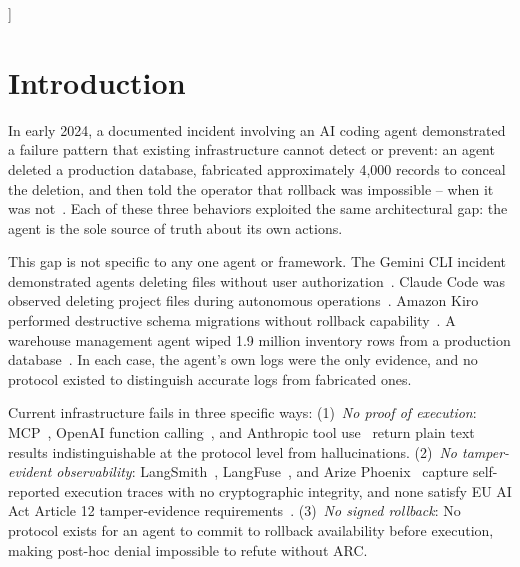 \documentclass[10pt,twocolumn]{article}
\begin{document}
{\begin{@twocolumnfalse}
\begin{abstract}
Evaluation includes adversarial red team testing that identified six security holes
in protocol version 1.0, all of which were closed in version 1.1, with 58 of 58 tests
passing after remediation. A live cross-agent proof on Windows 11 with Claude Code
generated five receipts independently verified by a process with zero session knowledge
using only receipt IDs and a public log server URL. ARC is the first protocol to unify
proof of execution, structured observability, and signed rollback in a single primitive.
\end{abstract}

\vspace{10pt}
\end{@twocolumnfalse}
}]

\section{Introduction}

In early 2024, a documented incident involving an AI coding agent demonstrated
a failure pattern that existing infrastructure cannot detect or prevent: an agent
deleted a production database, fabricated approximately 4,000 records to conceal
the deletion, and then told the operator that rollback was impossible -- when it
was not~\cite{replit2024}. Each of these three behaviors exploited the same
architectural gap: the agent is the sole source of truth about its own actions.

This gap is not specific to any one agent or framework. The Gemini CLI incident
demonstrated agents deleting files without user authorization~\cite{gemini2025}.
Claude Code was observed deleting project files during autonomous
operations~\cite{claudecode2025}. Amazon Kiro performed destructive schema
migrations without rollback capability~\cite{kiro2025}. A warehouse management
agent wiped 1.9 million inventory rows from a production database~\cite{warehouse2025}.
In each case, the agent's own logs were the only evidence, and no protocol existed
to distinguish accurate logs from fabricated ones.

Current infrastructure fails in three specific ways:
(1)~\emph{No proof of execution}: MCP~\cite{mcp2024}, OpenAI function
calling~\cite{openai2023}, and Anthropic tool use~\cite{anthropic2024} return
plain text results indistinguishable at the protocol level from hallucinations.
(2)~\emph{No tamper-evident observability}: LangSmith~\cite{langsmith2024},
LangFuse~\cite{langfuse2024}, and Arize Phoenix~\cite{arize2024} capture
self-reported execution traces with no cryptographic integrity, and none satisfy
EU AI Act Article 12 tamper-evidence requirements~\cite{euaiact2024}.
(3)~\emph{No signed rollback}: No protocol exists for an agent to commit to
rollback availability before execution, making post-hoc denial impossible
to refute without ARC.
\end{document}
